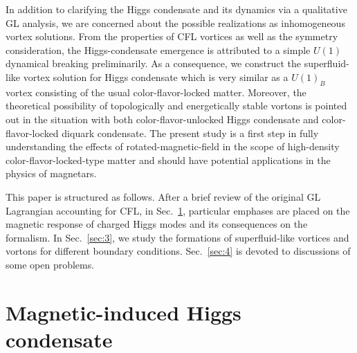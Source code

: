 \documentclass[12pt]{article}
\begin{document}
In addition to clarifying the Higgs condensate and its dynamics via a qualitative GL analysis, we are concerned about the possible realizations as inhomogeneous vortex solutions. 
From the properties of CFL vortices as well as the symmetry consideration, the Higgs-condensate emergence is attributed to a simple $U(1)$ dynamical breaking preliminarily. 
As a consequence, we construct the superfluid-like vortex solution for Higgs condensate which is very similar as 
a $U(1)_B$ vortex consisting of the usual color-flavor-locked matter.
Moreover, the theoretical possibility of topologically and energetically stable vortons is pointed out in the situation with both color-flavor-unlocked Higgs condensate and color-flavor-locked diquark condensate.
The present study is a first step in fully understanding the effects of rotated-magnetic-field in the scope of high-density color-flavor-locked-type matter and should have potential applications in the physics of magnetars.

This paper is structured as follows. After a brief review of the original GL Lagrangian accounting for CFL, in
Sec.~\ref{sec:2}, particular emphases are placed on the magnetic response of charged Higgs modes and its
consequences on the formalism. In Sec.~\ref{sec:3}, we study the formations of superfluid-like vortices and vortons 
for different boundary conditions. Sec.~\ref{sec:4} is devoted to discussions of some open problems.

\section{\bf Magnetic-induced Higgs condensate }
\label{sec:2}
\vspace{0.2cm}
\end{document}
